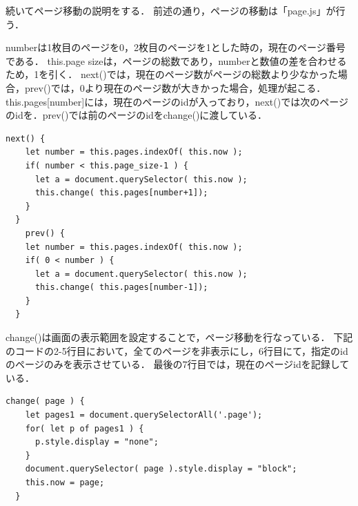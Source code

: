 \documentclass[a4j,12pt]{jsarticle}
\begin{document}
続いてページ移動の説明をする．
前述の通り，ページの移動は「page.js」が行う．

numberは1枚目のページを0，2枚目のページを1とした時の，現在のページ番号である．
this.page sizeは，ページの総数であり，numberと数値の差を合わせるため，1を引く．
next()では，現在のページ数がページの総数より少なかった場合，prev()では，0より現在のページ数が大きかった場合，処理が起こる．
this.pages[number]には，現在のページのidが入っており，next()では次のページのidを．prev()では前のページのidをchange()に渡している．
 \begin{lstlisting}[basicstyle=\ttfamily\footnotesize, frame=single]
  next() {
    let number = this.pages.indexOf( this.now );
    if( number < this.page_size-1 ) {
      let a = document.querySelector( this.now );
      this.change( this.pages[number+1]);
    }
  }
    prev() {
    let number = this.pages.indexOf( this.now );
    if( 0 < number ) {
      let a = document.querySelector( this.now );
      this.change( this.pages[number-1]);
    }
  }
 \end{lstlisting}
 
 
change()は画面の表示範囲を設定することで，ページ移動を行なっている．
下記のコードの2-5行目において，全てのページを非表示にし，6行目にて，指定のidのページのみを表示させている．
最後の7行目では，現在のページidを記録している．
 
 \begin{lstlisting}[basicstyle=\ttfamily\footnotesize, frame=single]
  change( page ) {
    let pages1 = document.querySelectorAll('.page');
    for( let p of pages1 ) {　
      p.style.display = "none";
    }
    document.querySelector( page ).style.display = "block";
    this.now = page;
  }
 \end{lstlisting}
\end{document}
